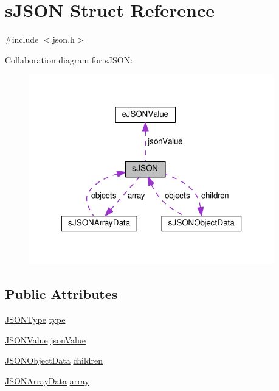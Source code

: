 \hypertarget{structsJSON}{}\section{s\+J\+S\+ON Struct Reference}
\label{structsJSON}


{\ttfamily \#include $<$json.\+h$>$}



Collaboration diagram for s\+J\+S\+ON\+:\nopagebreak
\begin{figure}[H]
\begin{center}
\leavevmode
\includegraphics[width=302pt]{structsJSON__coll__graph}
\end{center}
\end{figure}
\subsection*{Public Attributes}
\begin{DoxyCompactItemize}
\item 
\hyperlink{json_8h_af761d54284482a1af5a01d8f52845b49}{J\+S\+O\+N\+Type} \hyperlink{structsJSON_addb339436be83da160932a530dce47d1}{type}
\item 
\hyperlink{json_8h_acb7eaa79e9cdd0740c01726c3ba06e3e}{J\+S\+O\+N\+Value} \hyperlink{structsJSON_ae4d7953fe5e0369930ba3ddd91d64743}{json\+Value}
\item 
\hyperlink{json_8h_af22cd3b4d470b9136b3f3c689b753a59}{J\+S\+O\+N\+Object\+Data} \hyperlink{structsJSON_ab7bcf99ed5e4560654fe406448ef3dac}{children}
\item 
\hyperlink{json_8h_a8d5ddce2e622ca107422a7a136fcdc33}{J\+S\+O\+N\+Array\+Data} \hyperlink{structsJSON_a0c4e270679b9317e0ad2ad1373f7956e}{array}
\end{DoxyCompactItemize}


